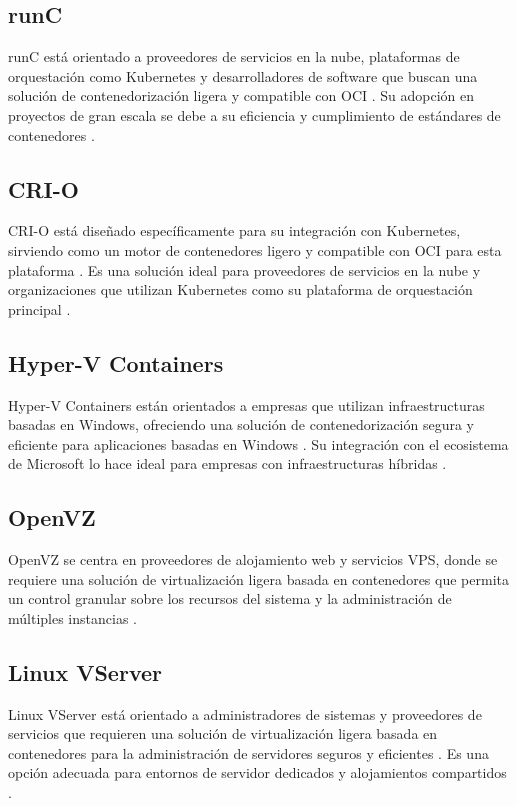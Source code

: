 \subsection{runC}
runC está orientado a proveedores de servicios en la nube, plataformas de orquestación como Kubernetes y desarrolladores de software que buscan una solución de contenedorización ligera y compatible con OCI \citep{Perez2005}. Su adopción en proyectos de gran escala se debe a su eficiencia y cumplimiento de estándares de contenedores \citep{151962df5f7e4b9faba0629540c11439}.

\subsection{CRI-O}
CRI-O está diseñado específicamente para su integración con Kubernetes, sirviendo como un motor de contenedores ligero y compatible con OCI para esta plataforma \citep{CNCF2019}. Es una solución ideal para proveedores de servicios en la nube y organizaciones que utilizan Kubernetes como su plataforma de orquestación principal \citep{151962df5f7e4b9faba0629540c11439}.

\subsection{Hyper-V Containers}
Hyper-V Containers están orientados a empresas que utilizan infraestructuras basadas en Windows, ofreciendo una solución de contenedorización segura y eficiente para aplicaciones basadas en Windows \citep{Smith2016}. Su integración con el ecosistema de Microsoft lo hace ideal para empresas con infraestructuras híbridas \citep{Clark2024}.

\subsection{OpenVZ}
OpenVZ se centra en proveedores de alojamiento web y servicios VPS, donde se requiere una solución de virtualización ligera basada en contenedores que permita un control granular sobre los recursos del sistema y la administración de múltiples instancias \citep{OpenVZ2015}.

\subsection{Linux VServer}
Linux VServer está orientado a administradores de sistemas y proveedores de servicios que requieren una solución de virtualización ligera basada en contenedores para la administración de servidores seguros y eficientes \citep{10.1145/1272996.1273025}. Es una opción adecuada para entornos de servidor dedicados y alojamientos compartidos \citep{LinuxVirt2017}.

